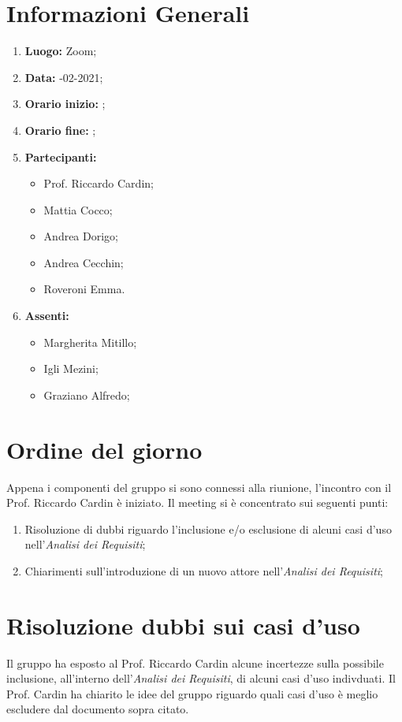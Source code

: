 \newpage
\section{Informazioni Generali}
\begin{enumerate}
	\item \textbf{Luogo:} \normalfont Zoom;
	\item \textbf{Data:} -02-2021;
	\item \textbf{Orario inizio:} ;
	\item \textbf{Orario fine:} ;
	\item \textbf{Partecipanti:}
	\begin{itemize}
		\item Prof. Riccardo Cardin;
		\item Mattia Cocco; 
		\item Andrea Dorigo;
		\item Andrea Cecchin;
		\item Roveroni Emma.
	\end{itemize}
	\item \textbf{Assenti:}
	\begin{itemize}
		\item Margherita Mitillo;
		\item Igli Mezini;
		\item Graziano Alfredo;
	\end{itemize}
\end{enumerate}
\section{Ordine del giorno}
Appena i componenti del gruppo si sono connessi alla riunione, l'incontro con il Prof. Riccardo Cardin è iniziato.
Il meeting si è concentrato sui seguenti punti:
\begin{enumerate}
	\item Risoluzione di dubbi riguardo l'inclusione e/o esclusione di alcuni casi d'uso nell'\textit{Analisi dei Requisiti};
	\item Chiarimenti sull'introduzione di un nuovo attore nell'\textit{Analisi dei Requisiti};
\end{enumerate}
\section{Risoluzione dubbi sui casi d'uso}
Il gruppo ha esposto al Prof. Riccardo Cardin alcune incertezze sulla possibile inclusione, all'interno dell'\textit{Analisi dei Requisiti}, di alcuni casi d'uso indivduati. Il Prof. Cardin ha chiarito le idee del gruppo riguardo quali casi d'uso è meglio escludere dal documento sopra citato. 
